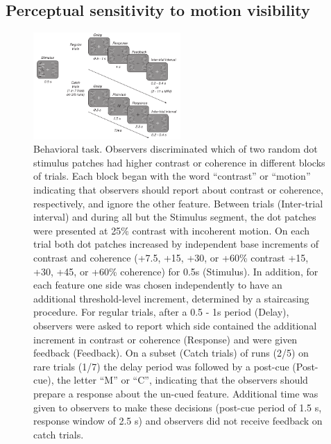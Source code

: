 \documentclass{report}
\begin{document}
\subsection{Perceptual sensitivity to motion visibility}


\begin{figure}
\centering
\includegraphics[keepaspectratio,width=0.5\textwidth]{figs_c2/Fig1_behav.pdf}
\caption[Behavioral task]{Behavioral task. Observers discriminated which of two random dot stimulus patches had higher contrast or coherence in different blocks of trials. Each block began with the word “contrast” or “motion” indicating that observers should report about contrast or coherence, respectively, and ignore the other feature. Between trials (Inter-trial interval) and during all but the Stimulus segment, the dot patches were presented at 25\% contrast with incoherent motion. On each trial both dot patches increased by independent base increments of contrast and coherence (+7.5, +15, +30, or +60\% contrast +15, +30, +45, or +60\% coherence) for 0.5s (Stimulus). In addition, for each feature one side was chosen independently to have an additional threshold-level increment, determined by a staircasing procedure. For regular trials, after a 0.5 - 1s period (Delay), observers were asked to report which side contained the additional increment in contrast or coherence (Response) and were given feedback (Feedback). On a subset (Catch trials) of runs (2/5) on rare trials (1/7) the delay period was followed by a post-cue (Post-cue), the letter “M” or “C”, indicating that the observers should prepare a response about the un-cued feature. Additional time was given to observers to make these decisions (post-cue period of 1.5 s, response window of 2.5 s) and observers did not receive feedback on catch trials.}
\label{fig:c4f1}
\end{figure}
\end{document}
